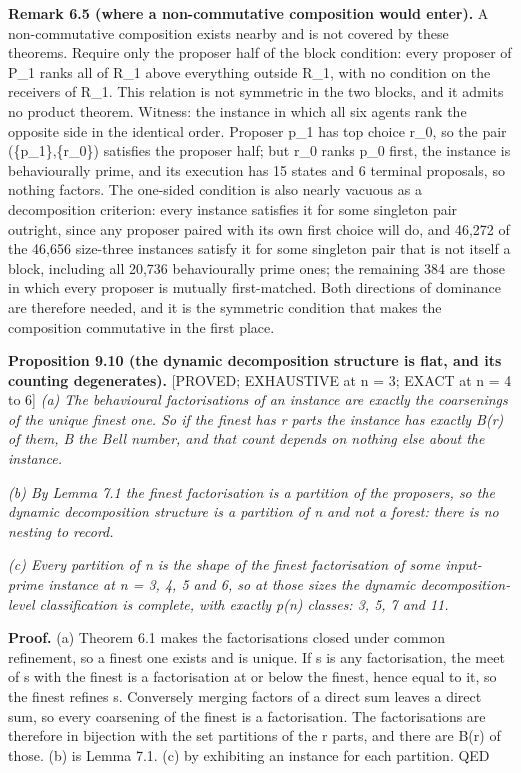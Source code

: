\documentclass[
  11pt,
]{article}
\begin{document}
\textbf{Remark 6.5 (where a non-commutative composition would enter).} A
non-commutative composition exists nearby and is not covered by these
theorems. Require only the proposer half of the block condition: every
proposer of P\_1 ranks all of R\_1 above everything outside R\_1, with
no condition on the receivers of R\_1. This relation is not symmetric in
the two blocks, and it admits no product theorem. Witness: the instance
in which all six agents rank the opposite side in the identical order.
Proposer p\_1 has top choice r\_0, so the pair (\{p\_1\},\{r\_0\})
satisfies the proposer half; but r\_0 ranks p\_0 first, the instance is
behaviourally prime, and its execution has 15 states and 6 terminal
proposals, so nothing factors. The one-sided condition is also nearly
vacuous as a decomposition criterion: every instance satisfies it for
some singleton pair outright, since any proposer paired with its own
first choice will do, and 46,272 of the 46,656 size-three instances
satisfy it for some singleton pair that is not itself a block, including
all 20,736 behaviourally prime ones; the remaining 384 are those in
which every proposer is mutually first-matched. Both directions of
dominance are therefore needed, and it is the symmetric condition that
makes the composition commutative in the first place.

\textbf{Proposition 9.10 (the dynamic decomposition structure is flat,
and its counting degenerates).} {[}PROVED; EXHAUSTIVE at n = 3; EXACT at
n = 4 to 6{]} \emph{(a) The behavioural factorisations of an instance
are exactly the coarsenings of the unique finest one. So if the finest
has r parts the instance has exactly B(r) of them, B the Bell number,
and that count depends on nothing else about the instance.}

\emph{(b) By Lemma 7.1 the finest factorisation is a partition of the
proposers, so the dynamic decomposition structure is a partition of n
and not a forest: there is no nesting to record.}

\emph{(c) Every partition of n is the shape of the finest factorisation
of some input-prime instance at n = 3, 4, 5 and 6, so at those sizes the
dynamic decomposition-level classification is complete, with exactly
p(n) classes: 3, 5, 7 and 11.}

\textbf{Proof.} (a) Theorem 6.1 makes the factorisations closed under
common refinement, so a finest one exists and is unique. If s is any
factorisation, the meet of s with the finest is a factorisation at or
below the finest, hence equal to it, so the finest refines s. Conversely
merging factors of a direct sum leaves a direct sum, so every coarsening
of the finest is a factorisation. The factorisations are therefore in
bijection with the set partitions of the r parts, and there are B(r) of
those. (b) is Lemma 7.1. (c) by exhibiting an instance for each
partition. QED
\end{document}
